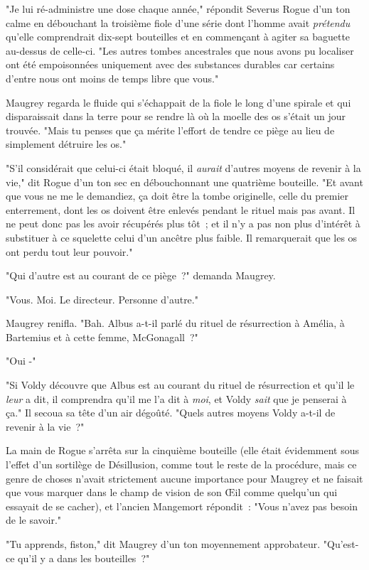 "Je lui ré-administre une dose chaque année," répondit Severus Rogue d'un ton calme en débouchant la troisième fiole d'une série dont l'homme avait \emph{prétendu} qu'elle comprendrait dix-sept bouteilles et en commençant à agiter sa baguette au-dessus de celle-ci. "Les autres tombes ancestrales que nous avons pu localiser ont été empoisonnées uniquement avec des substances durables car certains d'entre nous ont moins de temps libre que vous."

Maugrey regarda le fluide qui s'échappait de la fiole le long d'une spirale et qui disparaissait dans la terre pour se rendre là où la moelle des os s'était un jour trouvée. "Mais tu penses que ça mérite l'effort de tendre ce piège au lieu de simplement détruire les os."

"S'il considérait que celui-ci était bloqué, il \emph{aurait} d'autres moyens de revenir à la vie," dit Rogue d'un ton sec en débouchonnant une quatrième bouteille. "Et avant que vous ne me le demandiez, ça doit être la tombe originelle, celle du premier enterrement, dont les os doivent être enlevés pendant le rituel mais pas avant. Il ne peut donc pas les avoir récupérés plus tôt~; et il n'y a pas non plus d'intérêt à substituer à ce squelette celui d'un ancêtre plus faible. Il remarquerait que les os ont perdu tout leur pouvoir."

"Qui d'autre est au courant de ce piège~?" demanda Maugrey.

"Vous. Moi. Le directeur. Personne d'autre."

Maugrey renifla. "Bah. Albus a-t-il parlé du rituel de résurrection à Amélia, à Bartemius et à cette femme, McGonagall~?"

"Oui -"

"Si Voldy découvre que Albus est au courant du rituel de résurrection et qu'il le \emph{leur} a dit, il comprendra qu'il me l'a dit à \emph{moi}, et Voldy \emph{sait} que je penserai à ça." Il secoua sa tête d'un air dégoûté. "Quels autres moyens Voldy a-t-il de revenir à la vie~?"

La main de Rogue s'arrêta sur la cinquième bouteille (elle était évidemment sous l'effet d'un sortilège de Désillusion, comme tout le reste de la procédure, mais ce genre de choses n'avait strictement aucune importance pour Maugrey et ne faisait que vous marquer dans le champ de vision de son Œil comme quelqu'un qui essayait de se cacher), et l'ancien Mangemort répondit~: "Vous n'avez pas besoin de le savoir."

"Tu apprends, fiston," dit Maugrey d'un ton moyennement approbateur. "Qu'est-ce qu'il y a dans les bouteilles~?"

